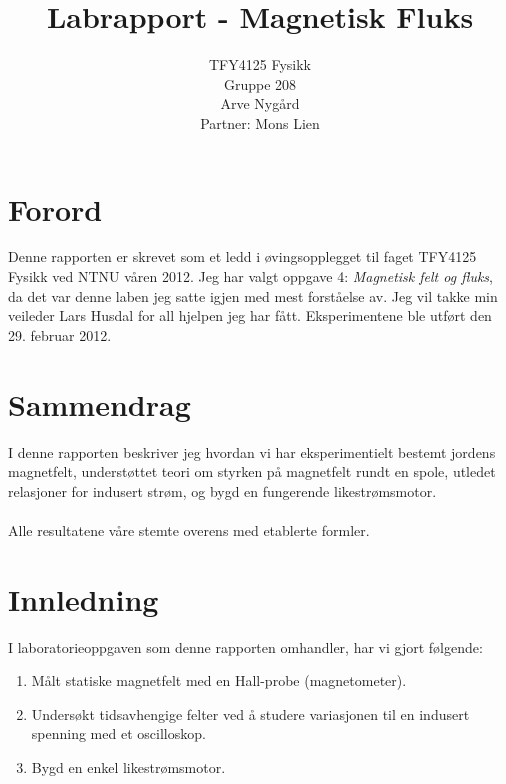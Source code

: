 \documentclass[12pt,norsk,a4paper]{article}
\begin{document}
\title{Labrapport - Magnetisk Fluks}
\author {TFY4125 Fysikk \\ Gruppe 208 \\ Arve Nygård \\ Partner: Mons Lien}

\maketitle

\clearpage



\section*{Forord}
Denne rapporten er skrevet som et ledd i øvingsopplegget til faget TFY4125 Fysikk ved NTNU våren 2012. Jeg har valgt oppgave 4: \textit{Magnetisk felt og fluks}, da det var denne laben jeg satte igjen med mest forståelse av. Jeg vil takke min veileder Lars Husdal for all hjelpen jeg har fått. Eksperimentene ble utført den 29. februar 2012.
\clearpage
\setcounter{page}{1}


\section*{Sammendrag}
I denne rapporten beskriver jeg hvordan vi har eksperimentielt bestemt jordens magnetfelt, understøttet teori om styrken på magnetfelt rundt en spole, utledet relasjoner for indusert strøm, og bygd en fungerende likestrømsmotor.\\
\\
Alle resultatene våre stemte overens med etablerte formler.
\clearpage




\tableofcontents
\clearpage


\section{Innledning}

I laboratorieoppgaven som denne rapporten omhandler, har vi gjort følgende:
\begin{enumerate}
\item Målt statiske magnetfelt med en Hall-probe (magnetometer). 
\item Undersøkt tidsavhengige felter ved å studere variasjonen til en indusert spenning med et oscilloskop. 
\item Bygd en enkel likestrømsmotor.
\end{enumerate}
\clearpage
\end{document}
